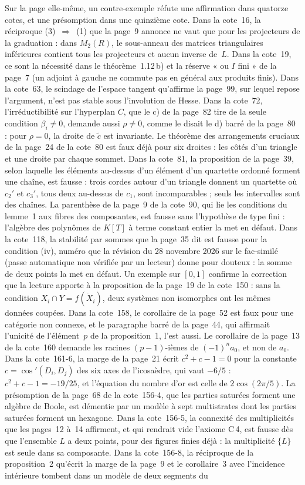 Sur la page elle-même, un contre-exemple réfute une affirmation dans quatorze cotes, et une présomption dans une quinzième cote. Dans la cote~16, la réciproque (3)~$\Rightarrow$~(1) que la page~9 annonce ne vaut que pour les projecteurs de la graduation : dans $M_2(R)$, le sous-anneau des matrices triangulaires inférieures contient tous les projecteurs et aucun inverse de~$L$. Dans la cote~19, ce sont la nécessité dans le théorème~1.12\,b) et la réserve « ou $I$ fini » de la page~7 (un adjoint à gauche ne commute pas en général aux produits finis). Dans la cote~63, le scindage de l'espace tangent qu'affirme la page~99, sur lequel repose l'argument, n'est pas stable sous l'involution de Hesse. Dans la cote~72, l'irréductibilité sur l'hyperplan $C$, que le c) de la page~82 tire de la seule condition $\beta_i \neq 0$, demande aussi $\rho \neq 0$, comme le disait le d) barré de la page~80 : pour $\rho = 0$, la droite de $\tilde c$ est invariante. Le théorème des arrangements cruciaux de la page~24 de la cote~80 est faux déjà pour six droites : les côtés d'un triangle et une droite par chaque sommet. Dans la cote~81, la proposition de la page~39, selon laquelle les éléments au-dessus d'un élément d'un quartette ordonné forment une chaîne, est fausse : trois cordes autour d'un triangle donnent un quartette où $c_2'$ et $c_3'$, tous deux au-dessus de $c_1$, sont incomparables ; seuls les intervalles sont des chaînes. La parenthèse de la page~9 de la cote~90, qui lie les conditions du lemme~1 aux fibres des composantes, est fausse sans l'hypothèse de type fini : l'algèbre des polynômes de $K[T]$ à terme constant entier la met en défaut. Dans la cote~118, la stabilité par sommes que la page~35 dit  est fausse pour la condition (iv), numéro que la révision du 28 novembre 2026 sur le fac-similé (passe automatique non vérifiée par un lecteur) donne pour douteux : la somme de deux points la met en défaut. Un exemple sur $[0, 1]$ confirme la correction que la lecture apporte à la proposition de la page~19 de la cote~150 : sans la condition $X_i \cap Y = f(\dot X_i)$, deux systèmes non isomorphes ont les mêmes données coupées. Dans la cote~158, le corollaire de la page~52 est faux pour une catégorie non connexe, et le paragraphe barré de la page~44, qui affirmait l'unicité de l'élément~$p$ de la proposition~1, l'est aussi. Le corollaire de la page~13 de la cote~160 demande les racines $(p-1)$-ièmes de $(-1)^n a_0$, et non de $a_0$. Dans la cote~161-6, la marge de la page~21 écrit $c^2 + c - 1 = 0$ pour la constante $c = \cos'(D_i, D_j)$ des six axes de l'icosaèdre, qui vaut $-6/5$ : $c^2 + c - 1 = -19/25$, et l'équation du nombre d'or est celle de $2\cos(2\pi/5)$. La présomption de la page~68 de la cote~156-4, que les parties saturées forment une algèbre de Boole, est démentie par un modèle à sept multistrates dont les parties saturées forment un hexagone. Dans la cote~156-5, la connexité des multiplicités que les pages~12 à~14 affirment, et qui rendrait vide l'axiome C\,4, est fausse dès que l'ensemble $L$ a deux points, pour des figures finies déjà : la multiplicité $\{L\}$ est seule dans sa composante. Dans la cote~156-8, la réciproque de la proposition~2 qu'écrit la marge de la page~9 et le corollaire~3 avec l'incidence intérieure tombent dans un modèle de deux segments du 